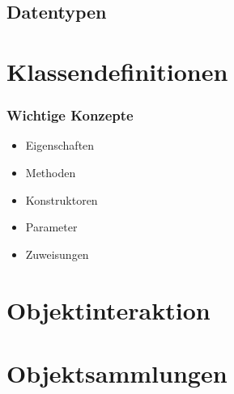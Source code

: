 \subsection{Datentypen}
\label{subsec:datatypes}



\section{Klassendefinitionen}
\label{sec:class-definitions}

\begin{frame}[fragile]
    \frametitle<presentation>{Wichtige Konzepte}

    \begin{itemize}
        \item Eigenschaften
        \item Methoden
        \item Konstruktoren
        \item Parameter
        \item Zuweisungen
    \end{itemize}

\end{frame}



\section{Objektinteraktion}
\label{sec:interaction}



\section{Objektsammlungen}
\label{sec:collections}

